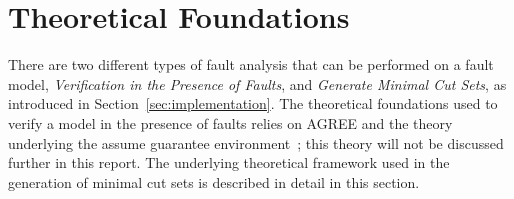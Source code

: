 \section{Theoretical Foundations}
\label{sec:theory}

There are two different types of fault analysis that can be performed on a fault model, \textit{Verification in the Presence of Faults}, and \textit{Generate Minimal Cut Sets}, as introduced in Section~\ref{sec:implementation}. The theoretical foundations used to verify a model in the presence of faults relies on AGREE and the theory underlying the assume guarantee environment~\cite{cofer2012compositional}; this theory will not be discussed further in this report. The underlying theoretical framework used in the generation of minimal cut sets is described in detail in this section. 



%
%











































